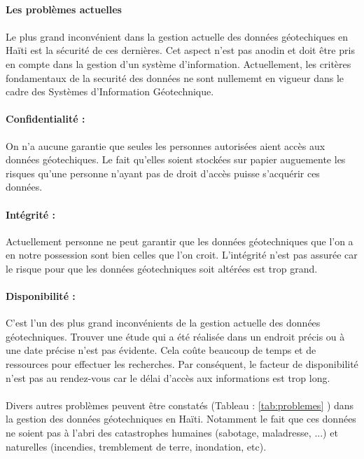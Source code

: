 \paragraph{Les problèmes actuelles}
\paragraph{}
Le plus grand inconvénient dans la gestion actuelle des données géotechiques
en Haïti est la sécurité de ces dernières. 
Cet aspect n'est pas anodin et doit être pris en compte dans la gestion d'un système
d'information.
Actuellement, les critères fondamentaux de la securité des données ne sont nullememt en 
vigueur dans le cadre des Systèmes d'Information Géotechnique.
\paragraph{Confidentialité : }
On n'a aucune garantie que seules les personnes autorisées 
aient accès aux données géotechiques. Le fait qu'elles soient
stockées sur papier auguemente les risques qu'une personne
n'ayant pas de droit d'accès puisse s'acquérir ces données.
\paragraph{Intégrité : }
Actuellement personne ne peut
garantir que les données géotechniques que l'on a en notre possession 
sont bien celles que l’on croit. L'intégrité n'est pas assurée car le risque
pour que les données géotechniques soit altérées est trop grand.
\paragraph{Disponibilité :}
C'est l'un des plus grand inconvénients de la gestion actuelle des 
données géotechniques. Trouver une étude qui a été réalisée dans un endroit précis
ou à une date précise n'est pas évidente. Cela coûte beaucoup de temps et de ressources 
pour effectuer
les recherches. Par conséquent, le facteur de disponibilité n'est pas 
au rendez-vous car le délai d'accès aux informations est trop long.

\paragraph{}
Divers autres problèmes peuvent être constatés (Tableau : \ref{tab:problemes} )  dans la gestion
des données géotechniques en Haïti. Notamment le fait que ces données
ne soient pas à l'abri des catastrophes humaines (sabotage, maladresse, ...) et naturelles
(incendies, tremblement de terre, inondation, etc).


